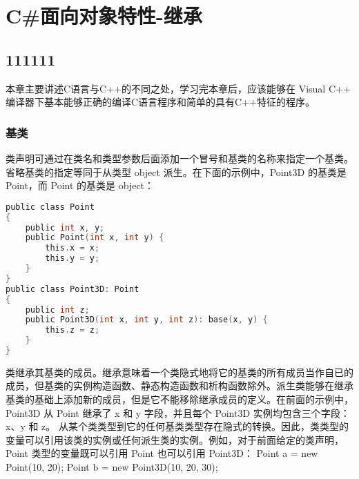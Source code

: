 ﻿%

\chapter{C\#面向对象特性-继承}
\section{111111}
本章主要讲述C语言与C++的不同之处，学习完本章后，应该能够在 Visual C++
编译器下基本能够正确的编译C语言程序和简单的具有C++特征的程序。

 
\subsection{基类}

类声明可通过在类名和类型参数后面添加一个冒号和基类的名称来指定一个基类。
省略基类的指定等同于从类型 object 派生。在下面的示例中，Point3D 的基类是 Point，而 Point 的基类是 object：

 \begin{lstlisting}[language=C] 
public class Point
{
    public int x, y;
    public Point(int x, int y) {
        this.x = x;
        this.y = y;
    }
}
public class Point3D: Point
{
    public int z;
    public Point3D(int x, int y, int z): base(x, y) {
        this.z = z;
    }
}
 \end{lstlisting}

类继承其基类的成员。继承意味着一个类隐式地将它的基类的所有成员当作自已的成员，但基类的实例构造函数、静态构造函数和析构函数除外。派生类能够在继承基类的基础上添加新的成员，但是它不能移除继承成员的定义。在前面的示例中，Point3D 从 Point 继承了 x 和 y 字段，并且每个 Point3D 实例均包含三个字段：x、y 和 z。
从某个类类型到它的任何基类类型存在隐式的转换。因此，类类型的变量可以引用该类的实例或任何派生类的实例。例如，对于前面给定的类声明，Point 类型的变量既可以引用 Point 也可以引用 Point3D：
Point a = new Point(10, 20);
Point b = new Point3D(10, 20, 30);
